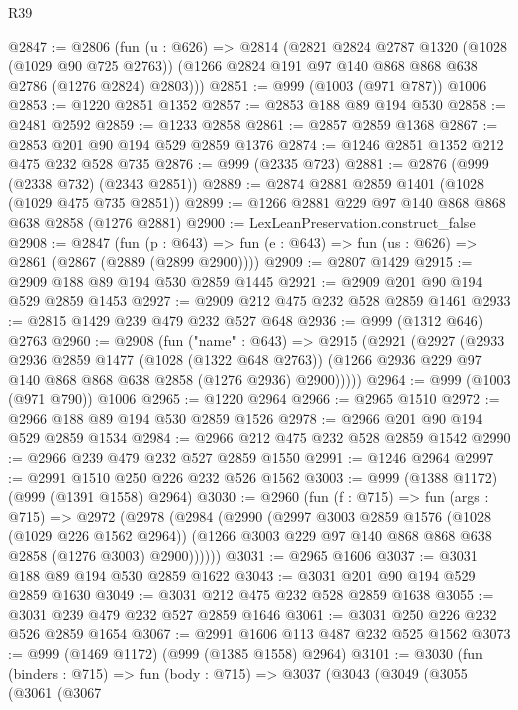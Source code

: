 \begin{lexlean}{R39}
\begin{coremodule}
@2847 := @2806
    (fun (u : @626) =>
    @2814
      (@2821
        @2824
        @2787
        @1320
        (@1028 (@1029 @90 @725 @2763))
        (@1266 @2824 @191 @97 @140 @868 @868 @638 @2786 (@1276 @2824) @2803)))
@2851 := @999 (@1003 (@971 @787)) @1006
@2853 := @1220 @2851 @1352
@2857 := @2853 @188 @89 @194 @530
@2858 := @2481 @2592
@2859 := @1233 @2858
@2861 := @2857 @2859 @1368
@2867 := @2853 @201 @90 @194 @529 @2859 @1376
@2874 := @1246 @2851 @1352 @212 @475 @232 @528 @735
@2876 := @999 (@2335 @723)
@2881 := @2876 (@999 (@2338 @732) (@2343 @2851))
@2889 := @2874 @2881 @2859 @1401 (@1028 (@1029 @475 @735 @2851))
@2899 := @1266 @2881 @229 @97 @140 @868 @868 @638 @2858 (@1276 @2881)
@2900 := LexLeanPreservation.construct_false
@2908 := @2847
    (fun (p : @643) => fun (e : @643) => fun (us : @626) => @2861 (@2867 (@2889 (@2899 @2900))))
@2909 := @2807 @1429
@2915 := @2909 @188 @89 @194 @530 @2859 @1445
@2921 := @2909 @201 @90 @194 @529 @2859 @1453
@2927 := @2909 @212 @475 @232 @528 @2859 @1461
@2933 := @2815 @1429 @239 @479 @232 @527 @648
@2936 := @999 (@1312 @646) @2763
@2960 := @2908
    (fun ("name" : @643) =>
    @2915
      (@2921
        (@2927
          (@2933
            @2936
            @2859
            @1477
            (@1028 (@1322 @648 @2763))
            (@1266 @2936 @229 @97 @140 @868 @868 @638 @2858 (@1276 @2936) @2900)))))
@2964 := @999 (@1003 (@971 @790)) @1006
@2965 := @1220 @2964
@2966 := @2965 @1510
@2972 := @2966 @188 @89 @194 @530 @2859 @1526
@2978 := @2966 @201 @90 @194 @529 @2859 @1534
@2984 := @2966 @212 @475 @232 @528 @2859 @1542
@2990 := @2966 @239 @479 @232 @527 @2859 @1550
@2991 := @1246 @2964
@2997 := @2991 @1510 @250 @226 @232 @526 @1562
@3003 := @999 (@1388 @1172) (@999 (@1391 @1558) @2964)
@3030 := @2960
    (fun (f : @715) =>
    fun (args : @715) =>
    @2972
      (@2978
        (@2984
          (@2990
            (@2997
              @3003
              @2859
              @1576
              (@1028 (@1029 @226 @1562 @2964))
              (@1266 @3003 @229 @97 @140 @868 @868 @638 @2858 (@1276 @3003) @2900))))))
@3031 := @2965 @1606
@3037 := @3031 @188 @89 @194 @530 @2859 @1622
@3043 := @3031 @201 @90 @194 @529 @2859 @1630
@3049 := @3031 @212 @475 @232 @528 @2859 @1638
@3055 := @3031 @239 @479 @232 @527 @2859 @1646
@3061 := @3031 @250 @226 @232 @526 @2859 @1654
@3067 := @2991 @1606 @113 @487 @232 @525 @1562
@3073 := @999 (@1469 @1172) (@999 (@1385 @1558) @2964)
@3101 := @3030
    (fun (binders : @715) =>
    fun (body : @715) =>
    @3037
      (@3043
        (@3049
          (@3055
            (@3061
              (@3067

\end{coremodule}
\end{lexlean}
